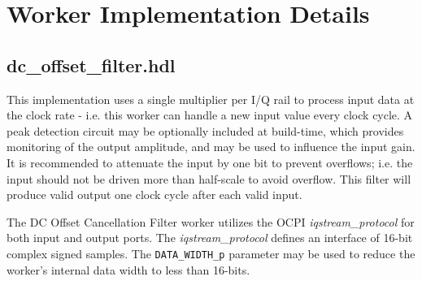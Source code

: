 \documentclass{article}
\def\comp{dc\_offset\_filter}
\begin{document}
\section*{Worker Implementation Details}
\subsection*{\comp.hdl}
\begin{flushleft}
	This implementation uses a single multiplier per I/Q rail to process input data at the clock rate - i.e. this worker can handle a new input value every clock cycle. A peak detection circuit may be optionally included at build-time, which provides monitoring of the output amplitude, and may be used to influence the input gain. It is recommended to attenuate the input by one bit to prevent overflows; i.e. the input should not be driven more than half-scale to avoid overflow. This filter will produce valid output one clock cycle after each valid input.\medskip

	The DC Offset Cancellation Filter worker utilizes the OCPI \textit{iqstream\_protocol} for both input and output ports. The \textit{iqstream\_protocol} defines an interface of 16-bit complex signed samples. The \verb+DATA_WIDTH_p+ parameter may be used to reduce the worker's internal data width to less than 16-bits.


\end{flushleft}
\end{document}
